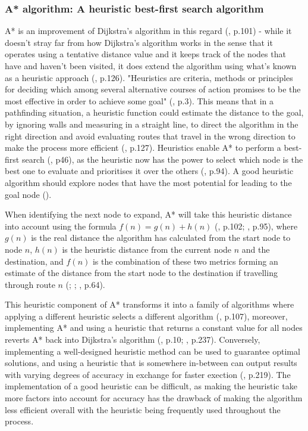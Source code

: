 \documentclass[11pt, a4paper]{article}
\begin{document}
\subsubsection{A* algorithm: A heuristic best-first search algorithm}

A* is an improvement of Dijkstra's algorithm in this regard (\cite{hart1968formal}, p.101) - while it doesn't stray far from how Dijkstra's algorithm works in the sense that it operates using a tentative distance value and it keeps track of the nodes that have and haven't been visited, it does extend the algorithm using what's known as a heuristic approach (\cite{cui2011based}, p.126). "Heuristics are criteria, methods or principles for deciding which among several alternative courses of action promises to be the most effective in order to achieve some goal" (\cite{pearl1984heuristics}, p.3). This means that in a pathfinding situation, a heuristic function could estimate the distance to the goal, by ignoring walls and measuring in a straight line, to direct the algorithm in the right direction and avoid evaluating routes that travel in the wrong direction to make the process more efficient (\cite{cui2011based}, p.127). Heuristics enable A* to perform a best-first search (\cite{yap2002grid}, p46), as the heuristic now has the power to select which node is the best one to evaluate and prioritises it over the others (\cite{russell2016artificial}, p.94). A good heuristic algorithm should explore nodes that have the most potential for leading to the goal node (\cite{korf1985depth}).

When identifying the next node to expand, A* will take this heuristic distance into account using the formula $f(n) = g(n) + h(n)$ (\cite{hart1968formal}, p.102; \cite{russell2016artificial}, p.95), where $g(n)$ is the real distance the algorithm has calculated from the start node to node $n$, $h(n)$ is the heuristic distance from the current node $n$ and the destination, and $f(n)$ is the combination of these two metrics forming an estimate of the distance from the start node to the destination if travelling through route $n$ (\cite{hart1968formal}; \cite{millington2019ai}; \cite{graham2003pathfinding}, p.64). 

This heuristic component of A* transforms it into a family of algorithms where applying a different heuristic selects a different algorithm (\cite{hart1968formal}, p.107), moreover, implementing A* and using a heuristic that returns a constant value for all nodes reverts A* back into Dijkstra's algorithm (\cite{lester2005pathfinding}, p.10; \cite{millington2019ai}, p.237). Conversely, implementing a well-designed heuristic method can be used to guarantee optimal solutions, and using a heuristic that is somewhere in-between can output results with varying degrees of accuracy in exchange for faster exection (\cite{millington2019ai}, p.219).  The implementation of a good heuristic can be difficult, as making the heuristic take more factors into account for accuracy has the drawback of making the algorithm less efficient overall with the heuristic being frequently used throughout the process.
\end{document}
